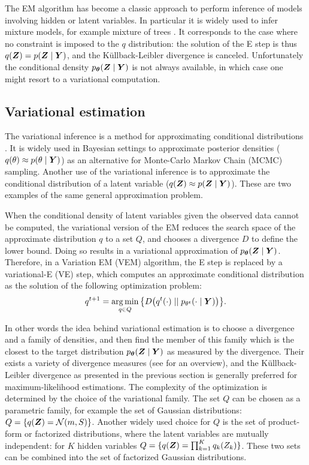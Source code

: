 The EM algorithm has become a classic approach to perform inference of models involving hidden or latent variables. In particular it is widely used to infer mixture models, for example mixture of trees \cite{MixtTrees}. It corresponds to the case where no constraint is imposed to the $q$ distribution: the solution of the E step is thus $q({\boldsymbol{Z}})=p({\boldsymbol{Z}}\mid{\boldsymbol{Y}})$, and the Küllback-Leibler divergence is canceled.  Unfortunately the conditional density $p_{\boldsymbol{\theta}}({\boldsymbol{Z}}\mid{\boldsymbol{Y}})$ is not always available, in which case one might resort to a variational computation.
 

 \subsection{Variational estimation}
 The variational inference is a method for approximating conditional distributions \citep{JGZ99,WaJ08,BKM17}. It is widely used in Bayesian settings to approximate posterior densities  ($q(\theta)\approx p(\theta\mid {\boldsymbol{Y}})$) as an alternative for Monte-Carlo Markov Chain (MCMC) sampling. Another use of the variational inference is to approximate the conditional distribution of a latent variable ($q({\boldsymbol{Z}}) \approx p({\boldsymbol{Z}}\mid {\boldsymbol{Y}})$). These are two examples of the same general approximation problem.
 
  When the conditional density of latent variables given the observed data cannot be computed, the variational version of the EM reduces the search space of the approximate distribution $q$  to a set $Q$, and chooses a divergence $D$ to define the lower bound. Doing so results in a variational approximation of $p_{\boldsymbol{\theta}}({\boldsymbol{Z}}\mid{\boldsymbol{Y}})$. Therefore, in a  Variation EM (VEM) algorithm, the E step is replaced by a variational-E (VE) step, which computes an approximate conditional distribution as the solution of the following optimization problem:
 $$q^{t+1}=\operatorname*{arg\,min}_{q\in Q} \big\{ D\big(q^t(\cdot) \mid\mid p_{\theta^t}(\cdot\mid{\boldsymbol{Y}})\big)\big\}.$$
 
 In other words the idea behind variational estimation is to choose a divergence and a family of densities, and then find the member of this family which is the closest to the target distribution $p_{\boldsymbol{\theta}}({\boldsymbol{Z}}\mid{\boldsymbol{Y}})$ as measured by the divergence. Their exists a variety of divergence measures (see \citet{M05} for an overview), and the Küllback-Leibler divergence as presented in the previous section is generally preferred for maximum-likelihood estimations. The complexity of the optimization is determined by the choice of the variational family. The set $Q$ can be chosen as a parametric family, for example the set of Gaussian distributions: $Q=\{q({\boldsymbol{Z}})=\mathcal{N}(m,S)\}$. Another widely used choice for $Q$ is the set of product-form or factorized distributions, where the latent variables are mutually independent: for $K$ hidden variables $Q=\{q({\boldsymbol{Z}})=\prod_{k=1}^K q_k(Z_k)\}$.  These two sets can be combined into the set of factorized Gaussian distributions. \\ 
 
